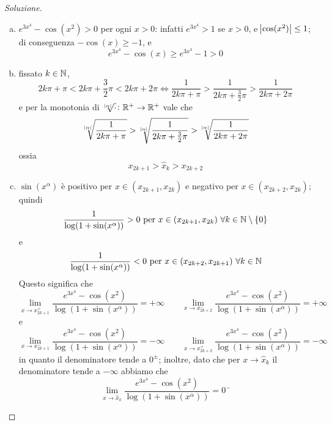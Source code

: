 \begin{proof}[Soluzione]
\begin{enumerate}[(i)]
\begin{enumerate}[(a)]
            \item $e^{3x^4}-\cos(x^2)>0$ per ogni $x>0$: infatti $e^{3x^4}>1$ se $x>0$, e $\abs{\cos(x^2)}\le 1$; di conseguenza $-\cos(x)\ge -1$, e 
            \[
            e^{3x^4}-\cos(x)\ge e^{3x^4}-1 >0
            \]
            \item fissato $k\in\amsbb{N}$,
            \[
            2k\pi + \pi  < 2k\pi + \frac{3}{2}\pi < 2k\pi + 2\pi \iff \frac{1}{2k\pi + \pi}> \frac{1}{2k\pi + \frac{3}{2}\pi}>\frac{1}{2k\pi + 2\pi}
            \]
            e per la monotonia di $\sqrt[\abs{\alpha}]{\cdot}\colon \amsbb{R}^+\to\amsbb{R}^+$ vale che
            \[
            \sqrt[\abs{\alpha}]{\frac{1}{2k\pi + \pi}}> \sqrt[\abs{\alpha}]{\frac{1}{2k\pi + \frac{3}{2}\pi}}>\sqrt[\abs{\alpha}]{\frac{1}{2k\pi + 2\pi}}
            \]
            ossia
            \[
            x_{2k+1}>\hat{x}_{k}>x_{2k+2}
            \]
            \item $\sin(x^\alpha)$ è positivo per $x\in (x_{2k+1}, x_{2k})$ e negativo per $x\in (x_{2k+2}, x_{2k})$; quindi
            \[
            \frac{1}{\log(1+\sin(x^\alpha))}>0 \ \text{per} \ x\in(x_{2k+1}, x_{2k}) \  \forall k\in\amsbb{N}\setminus\{0\}
            \]
            e
            \[
            \frac{1}{\log(1+\sin(x^\alpha))}<0 \ \text{per} \ x\in(x_{2k+2}, x_{2k+1}) \  \forall k\in\amsbb{N}
            \]
            Questo significa che
            \[
            \lim_{x\to x_{2k+1}^+} \frac{e^{3x^4}-\cos(x^2)}{\log(1+\sin(x^\alpha))} = +\infty \qquad \lim_{x\to x_{2k+2}^-} \frac{e^{3x^4}-\cos(x^2)}{\log(1+\sin(x^\alpha))} = +\infty
            \]
            e 
            \[
            \lim_{x\to x_{2k+1}^-} \frac{e^{3x^4}-\cos(x^2)}{\log(1+\sin(x^\alpha))} = -\infty \qquad \lim_{x\to x_{2k+2}^+} \frac{e^{3x^4}-\cos(x^2)}{\log(1+\sin(x^\alpha))} = -\infty
            \]
            in quanto il denominatore tende a $0^\pm$; inoltre, dato che per $x\to \hat{x}_k$ il denominatore tende a $-\infty$ abbiamo che
            \[
            \lim_{x\to \hat{x}_k} \frac{e^{3x^4}-\cos(x^2)}{\log(1+\sin(x^\alpha))} = 0^-
            \]
        \end{enumerate}
        \begin{center}
\end{center}
\end{enumerate}
\end{proof}
